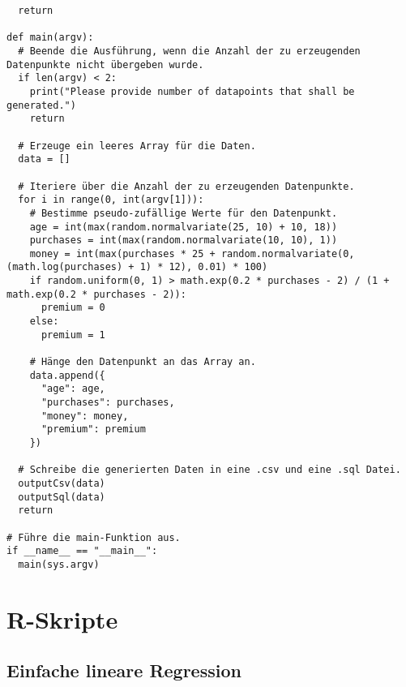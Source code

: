 \begin{verbatim}
  return

def main(argv):
  # Beende die Ausführung, wenn die Anzahl der zu erzeugenden Datenpunkte nicht übergeben wurde.
  if len(argv) < 2:
    print("Please provide number of datapoints that shall be generated.")
    return

  # Erzeuge ein leeres Array für die Daten.
  data = []

  # Iteriere über die Anzahl der zu erzeugenden Datenpunkte.
  for i in range(0, int(argv[1])):
    # Bestimme pseudo-zufällige Werte für den Datenpunkt.
    age = int(max(random.normalvariate(25, 10) + 10, 18))
    purchases = int(max(random.normalvariate(10, 10), 1))
    money = int(max(purchases * 25 + random.normalvariate(0, (math.log(purchases) + 1) * 12), 0.01) * 100)
    if random.uniform(0, 1) > math.exp(0.2 * purchases - 2) / (1 + math.exp(0.2 * purchases - 2)):
      premium = 0
    else:
      premium = 1

    # Hänge den Datenpunkt an das Array an.
    data.append({
      "age": age,
      "purchases": purchases,
      "money": money,
      "premium": premium
    })

  # Schreibe die generierten Daten in eine .csv und eine .sql Datei.
  outputCsv(data)
  outputSql(data)
  return

# Führe die main-Funktion aus.
if __name__ == "__main__":
  main(sys.argv)
\end{verbatim}

\chapter{R-Skripte}
\label{appendix:B}

\section{Einfache lineare Regression}
\label{appendix:B:1}

